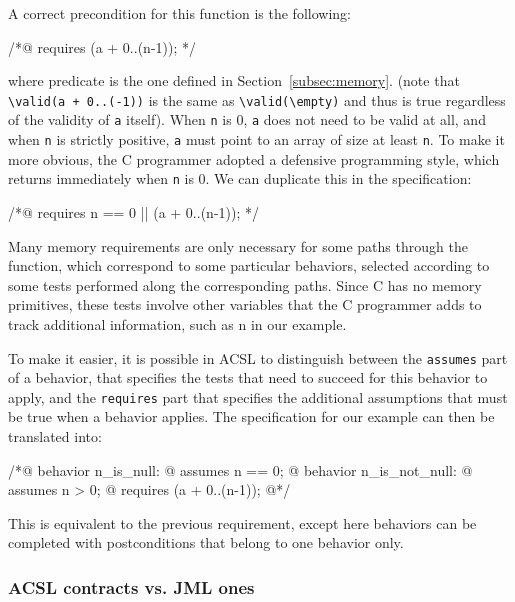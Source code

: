 \noindent
A correct precondition for this function is the following:

\begin{listing-nonumber}
/*@ requires \valid(a + 0..(n-1)); */
\end{listing-nonumber}

where predicate \valid is the one defined in Section~\ref{subsec:memory}.
(note that \lstinline|\valid(a + 0..(-1))| is the same as
\lstinline|\valid(\empty)| and thus is true regardless of the validity of
\lstinline|a| itself).
When \lstinline|n| is 0, \lstinline|a| does
not need to be valid at all, and when \lstinline|n| is strictly
positive, \lstinline|a| must point to an array of size at least
\lstinline|n|. To make it more obvious, the C programmer adopted a
defensive programming style, which returns immediately when \lstinline|n| is
0. We can duplicate this in the specification:

\begin{listing-nonumber}
/*@ requires n == 0 || \valid(a + 0..(n-1)); */
\end{listing-nonumber}

Many memory requirements are only necessary for some paths
through the function, which correspond to some particular
behaviors, selected according to some tests performed along the
corresponding paths. Since C has no memory
primitives, these tests involve other variables that the C programmer
adds to track additional information, such as {\ttfamily n} in our example.

To make it easier, it is possible in ACSL to distinguish between the
\lstinline|assumes| part of a behavior, that specifies the tests that need
to succeed for this behavior to apply, and the \lstinline|requires| part
that specifies the additional assumptions that must be true when a
behavior applies. The specification for our example can then be
translated into:

\begin{listing}{1}
/*@ behavior n_is_null:
  @   assumes n == 0;
  @ behavior n_is_not_null:
  @   assumes n > 0;
  @   requires \valid(a + 0..(n-1));
  @*/
\end{listing}

This is equivalent to the previous requirement, except here behaviors
can be completed with postconditions that belong to one behavior only.

\subsubsection*{ACSL contracts vs. JML ones}

